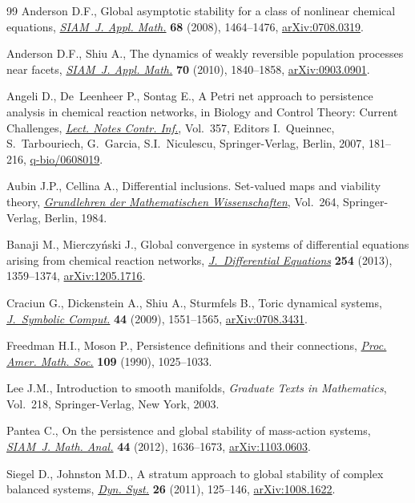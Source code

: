 \documentclass[11pt]{article}
\begin{document}
\begin{thebibliography}{99}
Anderson D.F., Global asymptotic stability for a class of nonlinear chemical
  equations, \href{http://dx.doi.org/10.1137/070698282}{\textit{SIAM~J. Appl. Math.}} \textbf{68} (2008), 1464--1476,
  \href{http://arxiv.org/abs/0708.0319}{arXiv:0708.0319}.

Anderson D.F., Shiu A., The dynamics of weakly reversible population processes
  near facets, \href{http://dx.doi.org/10.1137/090764098}{\textit{SIAM~J. Appl. Math.}} \textbf{70} (2010), 1840--1858,
  \href{http://arxiv.org/abs/0903.0901}{arXiv:0903.0901}.

Angeli D., De~Leenheer P., Sontag E., A {P}etri net approach to persistence
  analysis in chemical reaction networks, in Biology and Control Theory:
  Current Challenges, \href{http://dx.doi.org/10.1007/978-3-540-71988-5_9}{\textit{Lect. Notes Contr. Inf.}}, Vol.~357, Editors
  I.~Queinnec, S.~Tarbouriech, G.~Garcia, S.I.~Niculescu, Springer-Verlag,
  Berlin, 2007, 181--216, \href{http://arxiv.org/abs/q-bio/0608019}{q-bio/0608019}.

Aubin J.P., Cellina A., Dif\/ferential inclusions. Set-valued maps and viability
  theory, \href{http://dx.doi.org/10.1007/978-3-642-69512-4}{\textit{Grundlehren der Ma\-the\-matischen Wissenschaften}}, Vol.~264,
  Springer-Verlag, Berlin, 1984.

Banaji M., Mierczy{\'n}ski J., Global convergence in systems of dif\/ferential
  equations arising from chemical reaction networks, \href{http://dx.doi.org/10.1016/j.jde.2012.10.018}{\textit{J.~Differential
  Equations}} \textbf{254} (2013), 1359--1374, \href{http://arxiv.org/abs/1205.1716}{arXiv:1205.1716}.

Craciun G., Dickenstein A., Shiu A., Sturmfels B., Toric dynamical systems,
  \href{http://dx.doi.org/10.1016/j.jsc.2008.08.006}{\textit{J.~Symbolic Comput.}} \textbf{44} (2009), 1551--1565,
  \href{http://arxiv.org/abs/0708.3431}{arXiv:0708.3431}.

Freedman H.I., Moson P., Persistence def\/initions and their connections,
  \href{http://dx.doi.org/10.2307/2048133}{\textit{Proc. Amer. Math. Soc.}} \textbf{109} (1990), 1025--1033.

Lee J.M., Introduction to smooth manifolds, \textit{Graduate Texts in
  Mathematics}, Vol.~218, Springer-Verlag, New York, 2003.

Pantea C., On the persistence and global stability of mass-action systems,
  \href{http://dx.doi.org/10.1137/110840509}{\textit{SIAM~J. Math. Anal.}} \textbf{44} (2012), 1636--1673,
  \href{http://arxiv.org/abs/1103.0603}{arXiv:1103.0603}.

Siegel D., Johnston M.D., A stratum approach to global stability of complex
  balanced systems, \href{http://dx.doi.org/10.1080/14689367.2010.545812}{\textit{Dyn. Syst.}} \textbf{26} (2011), 125--146,
  \href{http://arxiv.org/abs/1008.1622}{arXiv:1008.1622}.

\end{thebibliography}
\end{document}
